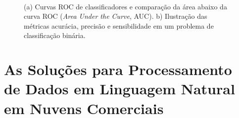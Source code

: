 \documentclass{SBCbookchapter}
\begin{document}
\begin{figure}[ht]
    \begin{center}
        \mbox{
        }
        \mbox{
        }
    \end{center}
    \caption{(a) Curvas ROC de classificadores e comparação da área abaixo da curva ROC (\textit{Area Under the Curve}, AUC). b) Ilustração das métricas acurácia, precisão e sensibilidade em um problema de classificação binária.}
    \label{fig:metricas_roc}
\end{figure}



\section{As Soluções para Processamento de Dados em Linguagem Natural em Nuvens Comerciais}
\label{sec:solucoes-nuvem}
\end{document}
